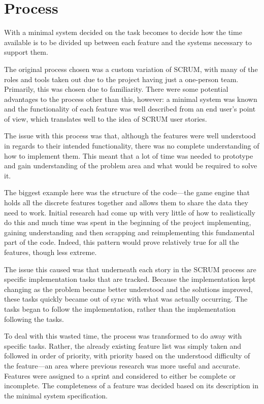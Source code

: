

\section{Process}
With a minimal system decided on the task becomes to decide how the time available is to be divided up between each feature and the systems necessary to support them.

The original process chosen was a custom variation of SCRUM, with many of the roles and tools taken out due to the project having just a one-person team. Primarily, this was chosen due to familiarity. There were some potential advantages to the process other than this, however: a minimal system was known and the functionality of each feature was well described from an end user's point of view, which translates well to the idea of SCRUM user stories.

The issue with this process was that, although the features were well understood in regards to their intended functionality, there was no complete understanding of how to implement them. This meant that a lot of time was needed to prototype and gain understanding of the problem area and what would be required to solve it.

The biggest example here was the structure of the code---the game engine that holds all the discrete features together and allows them to share the data they need to work. Initial research had come up with very little of how to realistically do this and much time was spent in the beginning of the project implementing, gaining understanding and then scrapping and reimplementing this fundamental part of the code. Indeed, this pattern would prove relatively true for all the features, though less extreme.

The issue this caused was that underneath each story in the SCRUM process are specific implementation tasks that are tracked. Because the implementation kept changing as the problem became better understood and the solutions improved, these tasks quickly became out of sync with what was actually occurring. The tasks began to follow the implementation, rather than the implementation following the tasks.

To deal with this wasted time, the process was transformed to do away with specific tasks. Rather, the already existing feature list was simply taken and followed in order of priority, with priority based on the understood difficulty of the feature---an area where previous research was more useful and accurate. Features were assigned to a sprint and considered to either be complete or incomplete. The completeness of a feature was decided based on its description in the minimal system specification.

